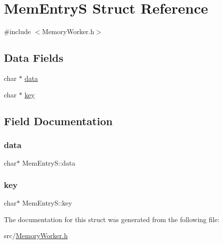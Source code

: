 \hypertarget{struct_mem_entry_s}{}\section{Mem\+EntryS Struct Reference}
\label{struct_mem_entry_s}


{\ttfamily \#include $<$Memory\+Worker.\+h$>$}

\subsection*{Data Fields}
\begin{DoxyCompactItemize}
\item 
char $\ast$ \hyperlink{struct_mem_entry_s_a618f6de313c16300e89fff54788377a6}{data}
\item 
char $\ast$ \hyperlink{struct_mem_entry_s_a6f669001ee897172eef563b615a789f0}{key}
\end{DoxyCompactItemize}


\subsection{Field Documentation}
\mbox{\label{struct_mem_entry_s_a618f6de313c16300e89fff54788377a6}} 
\subsubsection{\texorpdfstring{data}{data}}
{\footnotesize\ttfamily char$\ast$ Mem\+Entry\+S\+::data}

\mbox{\label{struct_mem_entry_s_a6f669001ee897172eef563b615a789f0}} 
\subsubsection{\texorpdfstring{key}{key}}
{\footnotesize\ttfamily char$\ast$ Mem\+Entry\+S\+::key}



The documentation for this struct was generated from the following file\+:\begin{DoxyCompactItemize}
\item 
src/\hyperlink{_memory_worker_8h}{Memory\+Worker.\+h}\end{DoxyCompactItemize}

